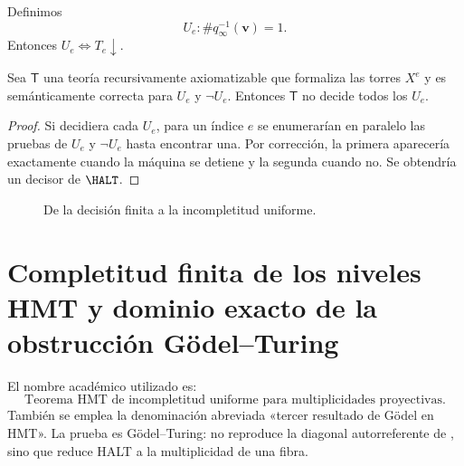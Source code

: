 Definimos
\[
  U_e:\#q_\infty^{-1}(\boldsymbol v)=1.
\]
Entonces \(U_e\iff T_e\downarrow\).

\begin{theorem}
\label{p3-83-c46-s1:thm:uniform-incompleteness}
Sea \(\mathsf T\) una teoría recursivamente axiomatizable que formaliza las
torres \(X^e\) y es semánticamente correcta para \(U_e\) y
\(\neg U_e\). Entonces \(\mathsf T\) no decide todos los \(U_e\).
\end{theorem}

\begin{proof}
Si decidiera cada \(U_e\), para un índice \(e\) se enumerarían en paralelo
las pruebas de \(U_e\) y \(\neg U_e\) hasta encontrar una. Por corrección,
la primera aparecería exactamente cuando la máquina se detiene y la segunda
cuando no. Se obtendría un decisor de \(\HALT\).
\end{proof}

\begin{figure}[H]
\centering
{}
\caption{De la decisión finita a la incompletitud uniforme.}
\label{p3-83-c46-s1:fig:godel-turing}
\end{figure}

\section{Completitud finita de los niveles HMT y dominio exacto de la obstrucción Gödel--Turing}

El nombre académico utilizado es:
\[
\boxed{\text{Teorema HMT de incompletitud uniforme para multiplicidades
proyectivas}.}
\]
También se emplea la denominación abreviada «tercer resultado de Gödel en
HMT». La prueba
es Gödel--Turing: no reproduce la diagonal autorreferente de
\cite{goedel1931}, sino que reduce HALT a la multiplicidad de una fibra.

